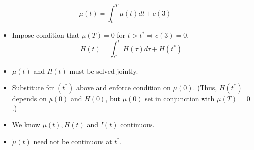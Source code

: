 \documentclass[12pt,compress,handout]{beamer}  %
\begin{document}
\begin{frame}
\begin{equation*}
\mu (t) = \int_{t}^{T}\dot{\mu}(t)dt+c(3)
\end{equation*}
\begin{itemize}[<+->]
\item
Impose condition that $\mu (T)=0$ for $t>t^{*}\Rightarrow c(3)=0$.
\begin{equation*}
H(t) = \int_{t^{*}}^{t}\dot{H}(\tau )d\tau +H(t^{*})
\end{equation*}

\item
$\mu (t)$ and $H(t)$ must be solved jointly.

\item
Substitute for $(t^{*})$ above and enforce condition on $\mu (0)$.
(Thus, $H(t^{*})$ depends on $\mu (0)$ and $H(0)$, but $\mu (0)$ set
in conjunction with $\mu (T)=0$.)

\item
We know $\mu (t),H(t)$ and $I(t)$ continuous.

\item
$\dot{\mu}(t)$ need not be continuous at $t^{*}$.
\end{itemize}
\end{frame}
\end{document}
